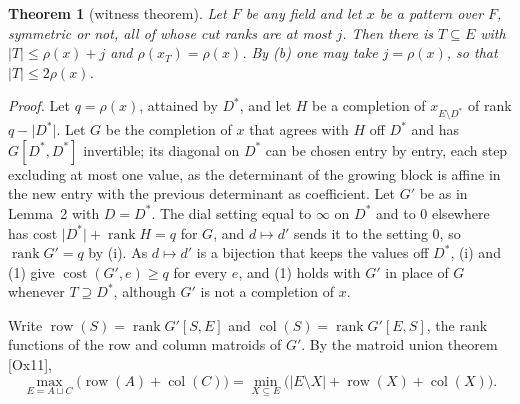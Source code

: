 \documentclass[11pt,letterpaper,reqno]{amsart}
\theoremstyle{spaced}
\newtheorem{theorem}{Theorem}
\begin{document}
\begin{theorem}[witness theorem]
Let \(F\) be any field and let \(x\) be a pattern over \(F\), symmetric or not, all of whose cut ranks are at most \(j\). Then there is \(T \subseteq E\) with \(\lvert T\rvert \le \rho(x) + j\) and \(\rho(x_T) = \rho(x)\). By (b) one may take \(j = \rho(x)\), so that \(\lvert T\rvert \le 2\rho(x)\).
\end{theorem}

\emph{Proof.} Let \(q = \rho(x)\), attained by \(D^*\), and let \(H\) be a completion of \(x_{E \setminus D^*}\) of rank \(q - \lvert D^*\rvert\). Let \(G\) be the completion of \(x\) that agrees with \(H\) off \(D^*\) and has \(G[D^*, D^*]\) invertible; its diagonal on \(D^*\) can be chosen entry by entry, each step excluding at most one value, as the determinant of the growing block is affine in the new entry with the previous determinant as coefficient. Let \(G'\) be as in Lemma~2 with \(D = D^*\). The dial setting equal to \(\infty\) on \(D^*\) and to \(0\) elsewhere has cost \(\lvert D^*\rvert + \operatorname{rank} H = q\) for \(G\), and \(d \mapsto d'\) sends it to the setting \(0\), so \(\operatorname{rank} G' = q\) by (i). As \(d \mapsto d'\) is a bijection that keeps the values off \(D^*\), (i) and (1) give \(\operatorname{cost}(G', e) \ge q\) for every \(e\), and (1) holds with \(G'\) in place of \(G\) whenever \(T \supseteq D^*\), although \(G'\) is not a completion of \(x\).

\begingroup{} Write \(\operatorname{row}(S) = \operatorname{rank} G'[S, E]\) and \(\operatorname{col}(S) = \operatorname{rank} G'[E, S]\), the rank functions of the row and column matroids of \(G'\). By the matroid union theorem {[}Ox11{]},
\[\max_{E = A \sqcup C}\big(\operatorname{row}(A) + \operatorname{col}(C)\big) = \min_{X \subseteq E}\big(\lvert E \setminus X\rvert + \operatorname{row}(X) + \operatorname{col}(X)\big).\]\par\endgroup
\end{document}
